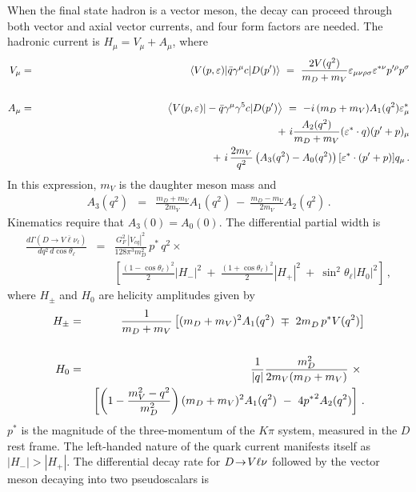 When the final state hadron is a vector meson, the decay can proceed through
both vector and axial vector currents, and four form factors are needed.
The hadronic current is $H^{}_\mu = V^{}_\mu + A^{}_\mu$, 
where~\cite{Gilman:1989uy} 
\begin{eqnarray}
V_\mu & = & \left< V(p,\varepsilon) | \bar{q}\gamma^\mu c | D(p') \right> \ =\  
\frac{2V(q^2)}{m_D+m_V} 
\varepsilon_{\mu\nu\rho\sigma}\varepsilon^{*\nu}p^{\prime\rho}p^\sigma \\
 & & \nonumber\\
A_\mu & = & \left< V(p,\varepsilon) | -\bar{q}\gamma^\mu\gamma^5 c | D(p') \right> 
 \ =\  -i\,(m_D+m_V)A_1(q^2)\varepsilon^*_\mu \nonumber \\
 & & \hskip2.10in 
  +\ i \frac{A_2(q^2)}{m_D+m_V}(\varepsilon^*\cdot q)(p' + p)_\mu \nonumber \\
 & & \hskip2.30in 
+\ i\,\frac{2m_V}{q^2}\left(A_3(q^2)-A_0(q^2)\right)[\varepsilon^*\cdot (p' + p)] q_\mu\,.
\end{eqnarray}
In this expression, $m_V$ is the daughter meson mass and
\begin{eqnarray}A_3(q^2) & = & \frac{m_D + m_V}{2m_V}A_1(q^2)\ -\ \frac{m_D - m_V}{2m_V}A_2(q^2)\,.
\end{eqnarray}
Kinematics require that $A_3(0) = A_0(0)$.
The differential partial width is
\begin{eqnarray}
\frac{d\Gamma(D \to V \overline \ell \nu_\ell)}{dq^2\, d\cos\theta_\ell} & = & 
  \frac{G_F^2\,|V_{cq}|^2}{128\pi^3m_D^2}\,p^*\,q^2 \times \nonumber \\
 & &  
\left[\frac{(1-\cos\theta_\ell)^2}{2}|H_-|^2\ +\  
\frac{(1+\cos\theta_\ell)^2}{2}|H_+|^2\ +\ \sin^2\theta_\ell|H_0|^2\right]\,,
\end{eqnarray}
where $H^{}_\pm$ and $H^{}_0$ are helicity amplitudes given by
\begin{eqnarray}
H_\pm & = & \frac{1}{m_D + m_V}\left[(m_D+m_V)^2A_1(q^2)\ \mp\ 
      2m^{}_D\,p^* V(q^2)\right] \\
 & & \nonumber \\
H_0 & = & \frac{1}{|q|}\frac{m_D^2}{2m_V(m_D + m_V)}\ \times\ \nonumber \\
 & & \hskip0.01in \left[
    \left(1- \frac{m_V^2 - q^2}{m_D^2}\right)(m_D + m_V)^2 A_1(q^2) 
    \ -\ 4{p^*}^2 A_2(q^2) \right]\,.
\label{HelDef}
\end{eqnarray}
$p^*$ is the magnitude of the three-momentum of the $K \pi$ system, measured in the $D$ rest frame.
The left-handed nature of the quark current manifests itself as
$|H_-|>|H_+|$. The differential decay rate for $D\!\rightarrow\! V\ell\nu$ 
followed by the vector meson decaying into two pseudoscalars is

